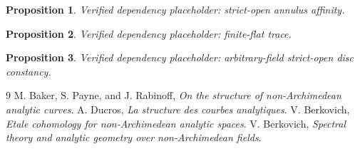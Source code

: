 \documentclass[11pt]{article}
\newtheorem{proposition}{Proposition}
\begin{document}
\begin{proposition}\label{prop:p062-arbitrary-field-annulus-candidate}
Verified dependency placeholder: strict-open annulus affinity.
\end{proposition}
\begin{proposition}\label{prop:p062-finite-flat-continuous-trace}
Verified dependency placeholder: finite-flat trace.
\end{proposition}
\begin{proposition}\label{prop:p062-arbitrary-field-disc}
Verified dependency placeholder: arbitrary-field strict-open disc constancy.
\end{proposition}


\raggedright
\begin{thebibliography}{9}
M. Baker, S. Payne, and J. Rabinoff,
\emph{On the structure of non-Archimedean analytic curves}.
A. Ducros, \emph{La structure des courbes analytiques}.
V. Berkovich,
\emph{Etale cohomology for non-Archimedean analytic spaces}.
V. Berkovich,
\emph{Spectral theory and analytic geometry over non-Archimedean fields}.
\end{thebibliography}
\end{document}
